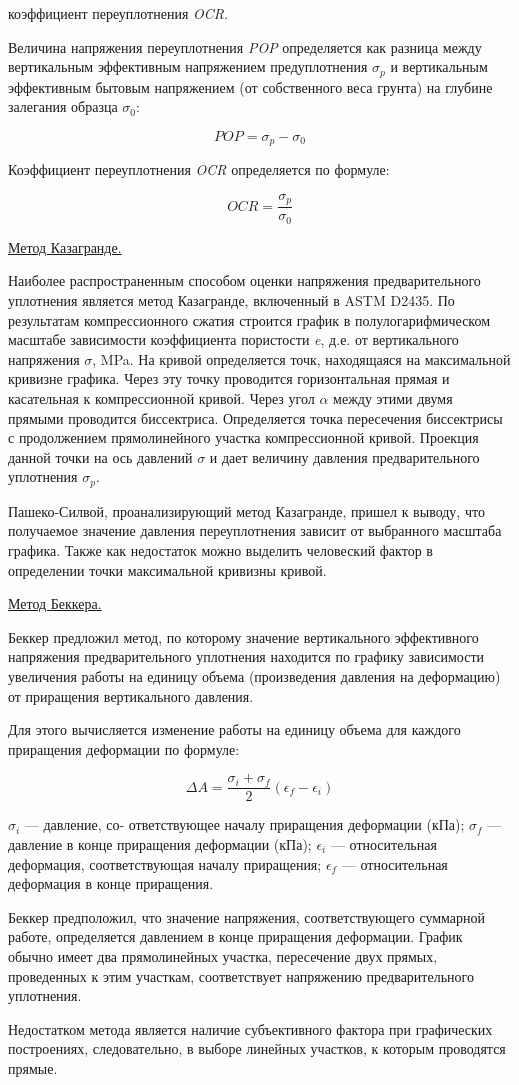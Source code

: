коэффициент переуплотнения \textit{OCR}.

Величина напряжения переуплотнения \textit{POP} определяется 
как разница между вертикальным эффективным напряжением 
предуплотнения $\sigma_p$ и вертикальным эффективным бытовым напряжением 
(от собственного веса грунта) на глубине залегания образца $\sigma_0$:

\[
   POP = \sigma_p - \sigma_0
\]

Коэффициент переуплотнения \textit{OCR} определяется по формуле:

\[
   OCR = \frac{\sigma_p}{\sigma_0}
\]

\underline{Метод Казагранде.}

Наиболее распространенным способом оценки напряжения предварительного 
уплотнения является метод Казагранде, включенный в ASTM D2435. 
По результатам компрессионного сжатия строится график в полулогарифмическом 
масштабе зависимости коэффициента пористости \textit{e}, д.е. от 
вертикального напряжения $\sigma$, \si{\mega\pascal}. 
На кривой определяется точк, находящаяся на максимальной кривизне 
графика. Через эту точку проводится горизонтальная прямая 
и касательная к компрессионной кривой. 
Через угол $\alpha$ между этими двумя прямыми проводится биссектриса. 
Определяется точка пересечения биссектрисы с продолжением прямолинейного 
участка компрессионной кривой. Проекция данной точки на ось давлений $\sigma$
и дает величину давления предварительного уплотнения $\sigma_p$.

Пашеко-Силвой, проанализирующий метод Казагранде, пришел к выводу, 
что получаемое значение давления переуплотнения зависит от выбранного
масштаба графика. Также как недостаток можно выделить человеский 
фактор в определении точки максимальной кривизны кривой.


\underline{Метод Беккера.}

Беккер предложил метод, по которому значение вертикального эффективного 
напряжения предварительного уплотнения находится по 
графику зависимости увеличения работы на единицу объема 
(произведения давления на деформацию) от приращения вертикального давления.

Для этого вычисляется изменение работы на единицу объема для каждого
приращения деформации по формуле:

\[
   \Delta A = \frac{\sigma_i + \sigma_f}{2}(\epsilon_f - \epsilon_i)
\]

$\sigma_i$ — давление, со-
ответствующее началу приращения деформации (кПа); 
$\sigma_f$ — давление в конце приращения деформации (кПа);
$\epsilon_i$ — относительная деформация, соответствующая началу приращения; 
$\epsilon_f$ — относительная деформация в конце
приращения.

Беккер предположил, что значение напряжения, соответствующего суммарной 
работе, определяется давлением в конце приращения деформации.
График обычно имеет два прямолинейных участка, пересечение 
двух прямых, проведенных к этим участкам, соответствует 
напряжению предварительного уплотнения. 

Недостатком метода является наличие субъективного фактора при
графических построениях, следовательно, в выборе линейных участков, 
к которым проводятся прямые.